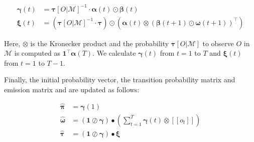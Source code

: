 \begin{align}
    \pmb{\gamma}(t) & = \pmb{\tau}[O | \mathcal{M}]^{-1} \cdot \pmb{\alpha}(t) \odot \pmb{\beta}(t)                                                                                 \\
    \pmb{\xi}(t)    & = (\pmb{\tau}[O | \mathcal{M}]^{-1} \cdot \pmb{\tau}) \odot \left( \pmb{\alpha}(t) \otimes \left(\pmb{\beta}(t+1) \odot \pmb{\omega}(t+1)\right)^\top \right)
\end{align}


Here, $\otimes$ is the Kronecker product and the probability $\pmb{\tau}[O | \mathcal{M}]$ to observe $O$ in $\mathcal{M}$ is computed as $\mathbf{1}^\top \pmb{\alpha}(T)$.
We calculate $\pmb{\gamma}(t)$ from $t= 1$ to $T$ and $\pmb{\xi}(t)$ from $t= 1$ to $T-1$.

Finally, the initial probability vector, the transition probability matrix and emission matrix and are updated as follows:


\begin{align}
    \hat{\pmb{\pi}}    & = \pmb{\gamma}(1)
    \label{eq:initial-probabilities-update}                                                                                               \\
    \hat{\pmb{\omega}} & = ( \mathbf{1} \oslash \pmb{\gamma}) \smblkcircle \left(\sum_{t=1}^{T} \pmb{\gamma}(t) \otimes {[[o_t]]} \right)
    \label{eq:emission-probabilities-update}                                                                                              \\
    \hat{\pmb{\tau}}   & = (\mathbf{1} \oslash \pmb{\gamma} ) \smblkcircle \pmb{\xi}
    \label{eq:transition-probabilities-update}
\end{align}






